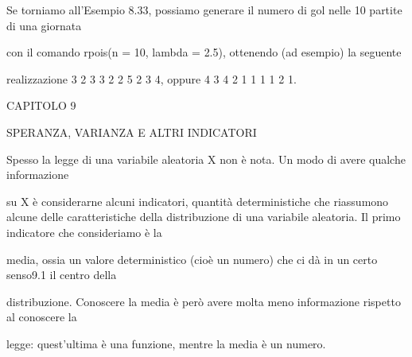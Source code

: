 \documentclass[a4paper,portrait,12pt]{article}
\begin{document}
\begin{flushleft}
Se torniamo all'Esempio 8.33, possiamo generare il numero di gol nelle 10 partite di una giornata
\end{flushleft}


\begin{flushleft}
con il comando rpois(n = 10, lambda = 2.5), ottenendo (ad esempio) la seguente
\end{flushleft}


\begin{flushleft}
realizzazione 3 2 3 3 2 2 5 2 3 4, oppure 4 3 4 2 1 1 1 1 2 1.
\end{flushleft}





\begin{flushleft}
\newpage
\newpage
CAPITOLO 9
\end{flushleft}


\begin{flushleft}
SPERANZA, VARIANZA E ALTRI INDICATORI
\end{flushleft}


\begin{flushleft}
Spesso la legge di una variabile aleatoria X non \`{e} nota. Un modo di avere qualche informazione
\end{flushleft}


\begin{flushleft}
su X \`{e} considerarne alcuni indicatori, quantit\`{a} deterministiche che riassumono alcune delle caratteristiche della distribuzione di una variabile aleatoria. Il primo indicatore che consideriamo \`{e} la
\end{flushleft}


\begin{flushleft}
media, ossia un valore deterministico (cio\`{e} un numero) che ci d\`{a} in un certo senso9.1 il centro della
\end{flushleft}


\begin{flushleft}
distribuzione. Conoscere la media \`{e} per\`{o} avere molta meno informazione rispetto al conoscere la
\end{flushleft}


\begin{flushleft}
legge: quest'ultima \`{e} una funzione, mentre la media \`{e} un numero.
\end{flushleft}
\end{document}
